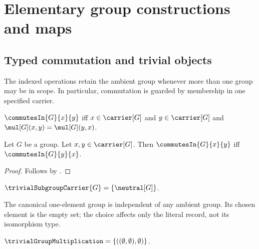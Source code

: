

\section{Elementary group constructions and maps}

\subsection{Typed commutation and trivial objects}

The indexed operations retain the ambient group whenever more than one group
may be in scope.  In particular, commutation is guarded by membership in one
specified carrier.

\begin{definition}\label{commutes_in}
    $\commutesIn{G}{x}{y}$ iff
        $x\in\carrier[G]$ and $y\in\carrier[G]$ and
        $\mul[G](x,y)=\mul[G](y,x)$.
\end{definition}

\begin{theorem}\label{commutes_in_symmetric}
    Let $G$ be a group.
    Let $x,y\in\carrier[G]$.
    Then $\commutesIn{G}{x}{y}$ iff
        $\commutesIn{G}{y}{x}$.
\end{theorem}
\begin{proof}
    Follows by .
\end{proof}

\begin{definition}\label{trivial_subgroup_carrier}
    $\trivialSubgroupCarrier{G}=\{\neutral[G]\}$.
\end{definition}

The canonical one-element group is independent of any ambient group.  Its
chosen element is the empty set; the choice affects only the literal record,
not its isomorphism type.

\begin{definition}\label{trivial_group_multiplication}
    $\trivialGroupMultiplication=
        \{((\emptyset,\emptyset),\emptyset)\}$.
\end{definition}

